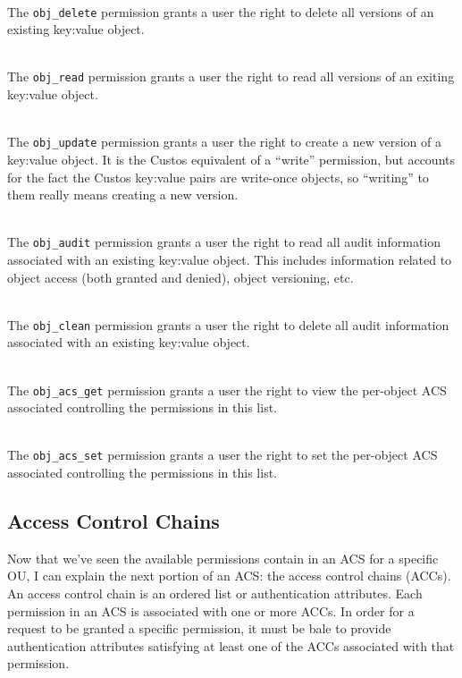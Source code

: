 \begin{packed_desc}
\item[\texttt{obj\_delete}] \hfill \\ The \texttt{obj\_delete}
  permission grants a user the right to delete all versions of an
  existing key:value object.
\item[\texttt{obj\_read}] \hfill \\ The \texttt{obj\_read} permission
  grants a user the right to read all versions of an exiting key:value
  object.
\item[\texttt{obj\_update}] \hfill \\ The \texttt{obj\_update}
  permission grants a user the right to create a new version of a
  key:value object. It is the Custos equivalent of a ``write''
  permission, but accounts for the fact the Custos key:value pairs are
  write-once objects, so ``writing'' to them really means creating a
  new version.
\item[\texttt{obj\_audit}] \hfill \\ The \texttt{obj\_audit}
  permission grants a user the right to read all audit information
  associated with an existing key:value object. This includes
  information related to object access (both granted and denied),
  object versioning, etc.
\item[\texttt{obj\_clean}] \hfill \\ The \texttt{obj\_clean}
  permission grants a user the right to delete all audit information
  associated with an existing key:value object.
\item[\texttt{obj\_acs\_get}] \hfill \\ The \texttt{obj\_acs\_get}
  permission grants a user the right to view the per-object ACS
  associated controlling the permissions in this list.
\item[\texttt{obj\_acs\_set}] \hfill \\ The \texttt{obj\_acs\_set}
  permission grants a user the right to set the per-object ACS
  associated controlling the permissions in this list.
\end{packed_desc}

\subsection{Access Control Chains}

Now that we've seen the available permissions contain in an ACS for a
specific OU, I can explain the next portion of an ACS: the access
control chains (ACCs). An access control chain is an ordered list or
authentication attributes. Each permission in an ACS is associated
with one or more ACCs. In order for a request to be granted a specific
permission, it must be bale to provide authentication attributes
satisfying at least one of the ACCs associated with that permission.

